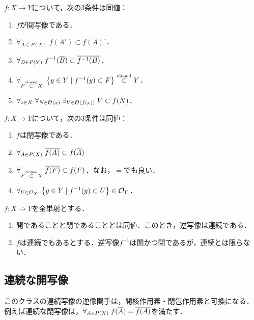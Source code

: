 \documentclass[uplatex,dvipdfmx]{jsreport}
\begin{document}
\begin{proposition}[演算子による開写像の特徴付け]
    $f:X\to Y$について，次の3条件は同値：
    \begin{enumerate}
        \item $f$が開写像である．
        \item $\forall_{A\in P(X)}\;f(A^\circ)\subset f(A)^\circ$．
        \item $\forall_{B\in P(Y)}\;f^{-1}(\overline{B})\subset\overline{f^{-1}(B)}$．
        \item $\forall_{F\overset{\textrm{closed}}{\subset} X}\;\left\{y\in Y\mid f^{-1}(y)\subset F\right\}\overset{\textrm{closed}}{\subset} Y$．
        \item $\forall_{x\in X}\;\forall_{N\in\mathcal{O}(x)}\;\exists_{V\in\mathcal{O}(f(x))}\;V\subset f(N)$．
    \end{enumerate}
\end{proposition}

\begin{proposition}[演算子による閉写像の特徴付け]
    $f:X\to Y$について，次の3条件は同値：
    \begin{enumerate}
        \item $f$は閉写像である．
        \item $\forall_{A\in P(X)}\;\overline{f(A)}\subset f(\overline{A})$
        \item $\forall_{F\overset{\textrm{closed}}{\subset} X}\;\overline{f(F)}\subset f(F)$．なお，$=$でも良い．
        \item $\forall_{U\in\mathcal{O}_X}\;\left\{y\in Y\mid f^{-1}(y)\subset U\right\}\in\mathcal{O}_Y$．
    \end{enumerate}
\end{proposition}

\begin{proposition}[全単射な開写像]
    $f:X\to Y$を全単射とする．
    \begin{enumerate}
        \item 開であることと閉であることとは同値．このとき，逆写像は連続である．
        \item $f$は連続でもあるとする．逆写像$f^{-1}$は開かつ閉であるが，連続とは限らない．
    \end{enumerate}
\end{proposition}

\subsection{連続な開写像}

\begin{tcolorbox}[colframe=ForestGreen, colback=ForestGreen!10!white,breakable,colbacktitle=ForestGreen!40!white,coltitle=black,fonttitle=\bfseries\sffamily,
title=]
    このクラスの連続写像の逆像関手は，開核作用素・閉包作用素と可換になる．
    例えば連続な閉写像は，$\forall_{A\in P(X)}\;f(\overline{A})=\overline{f(A)}$を満たす．
\end{tcolorbox}
\end{document}
